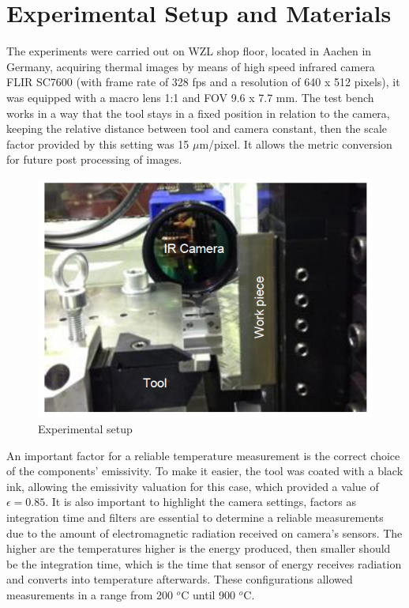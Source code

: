 	\section{Experimental Setup and Materials}
	\label{sec:exSetup}

	The experiments were carried out on WZL shop floor, located in Aachen in Germany, acquiring thermal images by means of high speed infrared camera FLIR SC7600 (with frame rate of 328 fps and a resolution of 640 x 512 pixels), it was equipped with a macro lens 1:1 and FOV 9.6 x 7.7 mm. The test bench works in a way that the tool stays in a fixed position in relation to the camera, keeping the relative distance between tool and camera constant, then the scale factor provided by this setting was 15 $\mu$m/pixel. It allows the metric conversion for future post processing of images.

	\begin{figure}[H]
		\centering
		\captionsetup{justification=centering}
		\includegraphics[scale = 0.5]{Cap3/exsetup.png}
		\caption{Experimental setup \cite{augspurger2016experimental}}
		\label{fig:exinfrared}
	\end{figure}

	An important factor for a reliable temperature measurement is the correct choice of the components' emissivity. To make it easier, the tool was coated with a black ink, allowing the emissivity valuation for this case, which provided a value of $\epsilon = 0.85$. It is also important to highlight the camera settings, factors as integration time and filters are essential to determine a reliable measurements due to the amount of electromagnetic radiation received on camera's sensors. The higher are the temperatures higher is the energy produced, then smaller should be the integration time, which is the time that sensor of energy receives radiation and converts into temperature afterwards. These configurations allowed measurements in a range from 200 $^{o}$C until 900 $^{o}$C.
	
